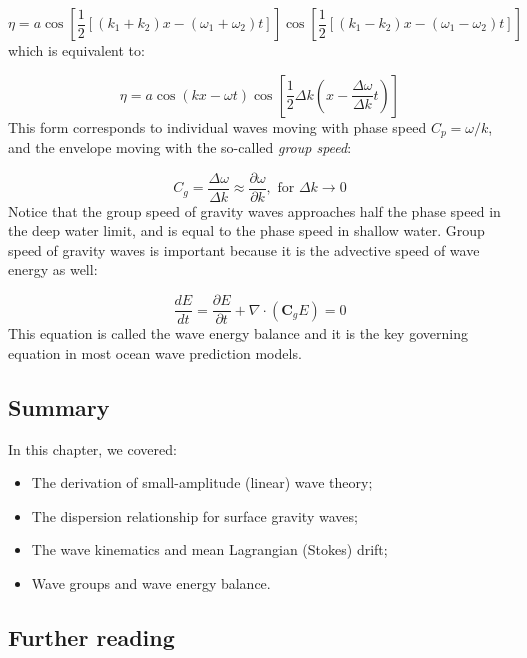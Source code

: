 \documentclass[12pt]{article}
\numberwithin{equation}{section}
\numberwithin{figure}{section}
\numberwithin{table}{section}
\begin{document}
\begin{equation}
  \eta = a \cos \left[ \frac{1}{2} [(k_1 + k_2)x - (\omega_1 + \omega_2)t] \right]
           \cos \left[ \frac{1}{2} [(k_1 - k_2)x - (\omega_1 - \omega_2)t] \right]
\end{equation}
which is equivalent to:

\begin{equation}
  \eta = a \cos(kx - \omega t) \cos\left[\frac{1}{2} \Delta k \left(x - \frac{\Delta \omega}{\Delta k} t \right) \right]
\end{equation}
This form corresponds to individual waves moving with phase speed $C_p = \omega/k$,
and the envelope moving with the so-called \textit{group speed}:

\begin{equation}
  C_g = \frac{\Delta \omega}{\Delta k} \approx \frac{\partial \omega}{\partial k}, \text{ for } \Delta k \to 0
  \label{eq:group_speed}
\end{equation}
Notice that the group speed of gravity waves approaches half the phase speed
in the deep water limit, and is equal to the phase speed in shallow water.
Group speed of gravity waves is important because it is the advective speed of
wave energy as well:

\begin{equation}
  \frac{d E}{dt} = \frac{\partial E}{\partial t} + \nabla \cdot (\mathbf{C}_g E) = 0
  \label{eq:wave_energy_advection}
\end{equation}
This equation is called the wave energy balance and it is the key governing
equation in most ocean wave prediction models.

\subsection*{Summary}

In this chapter, we covered:

\begin{itemize}
  \item The derivation of small-amplitude (linear) wave theory;
  \item The dispersion relationship for surface gravity waves;
  \item The wave kinematics and mean Lagrangian (Stokes) drift;
  \item Wave groups and wave energy balance.
\end{itemize}

\subsection*{Further reading}
\end{document}
